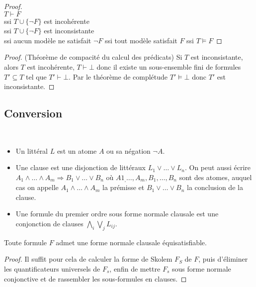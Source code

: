 \documentclass[a4paper]{article}
\begin{document}
\begin{proof}\mbox{}\\
  $T\vdash F$\\
  ssi $T\cup\{\neg F\}$ est incohérente\\
  ssi $T\cup\{\neg F\}$ est inconsistante\\
  ssi aucun modèle ne satisfait $\neg F$
  ssi tout modèle satisfait $F$
  ssi $T\models F$
\end{proof}

\begin{proof}(Théorème de compacité du calcul des prédicats)
  Si $T$ est inconsistante, alors $T$ est incohérente, $T\vdash\bot$ donc il existe un sous-ensemble fini de formules $T'\subseteq T$ tel que $T'\vdash\bot$. Par le théorème de complétude $T'\models\bot$ donc $T'$ est inconsistante.
\end{proof}

\subsection{Conversion}

\begin{definition}\mbox{}\\
  \begin{itemize}
  \item Un littéral $L$ est un atome $A$ ou sa négation $\neg A$.
  \item Une clause est une disjonction de littéraux $L_1\vee\dots\vee L_n$. On peut aussi écrire $A_1\wedge\dots\wedge A_m\Rightarrow B_1\vee\dots\vee B_n$ où $A1_,\dots,A_m,B_1,\dots,B_n$ sont des atomes, auquel cas on appelle $A_1\wedge\dots\wedge A_m$ la prémisse et $B_1\vee\dots\vee B_n$ la conclusion de la clause.
  \item Une formule du premier ordre sous forme normale clausale est une conjonction de clauses $\bigwedge_i\bigvee_j L_{ij}$.
\end{itemize}
\end{definition}

\begin{theorem}
  Toute formule $F$ admet une forme normale clausale équisatisfiable.
\end{theorem}

\begin{proof}
  Il suffit pour cela de calculer la forme de Skolem $F_S$ de $F$, puis d'éliminer les quantificateurs universels de $F_s$, enfin de mettre $F_s$ sous forme normale conjonctive et de rassembler les sous-formules en clauses.
\end{proof}
\end{document}
